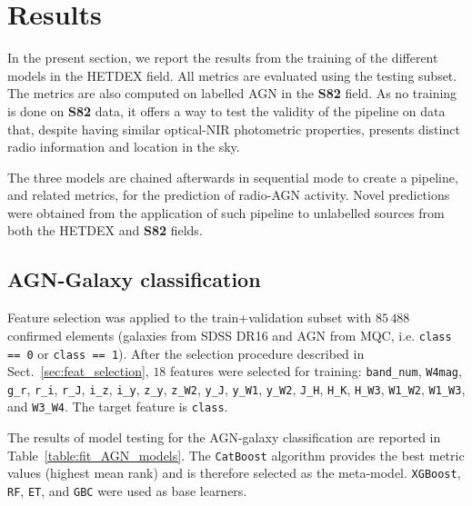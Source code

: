 \documentclass{aa}
\begin{document}

\section{Results}\label{sec:results}
In the present section, we report the results from the training of the different models in the HETDEX field. All metrics are evaluated using the testing subset. The metrics are also computed on labelled AGN in the \textbf{S82} field. As no training is done on \textbf{S82} data, it offers a way to test the validity of the pipeline on data that, despite having similar optical-NIR photometric properties, presents distinct radio information and location in the sky.

The three models are chained afterwards in sequential mode to create a pipeline, and related metrics, for the prediction of radio-AGN activity. Novel predictions were obtained from the application of such pipeline to unlabelled sources from both the HETDEX and \textbf{S82} fields. 

\subsection{AGN-Galaxy classification}\label{sec:results_agn}
Feature selection was applied to the train+validation subset with $85\,488$ confirmed elements (galaxies from SDSS DR16 and AGN from MQC, i.e. \texttt{class == 0} or \texttt{class == 1}). After the selection procedure described in Sect.~\ref{sec:feat_selection}, $18$ features were selected for training: \verb|band_num|, \verb|W4mag|, \verb|g_r|, \verb|r_i|, \verb|r_J|, \verb|i_z|, \verb|i_y|, \verb|z_y|, \verb|z_W2|, \verb|y_J|, \verb|y_W1|, \verb|y_W2|, \verb|J_H|, \verb|H_K|, \verb|H_W3|, \verb|W1_W2|, \verb|W1_W3|, and \verb|W3_W4|. The target feature is \verb|class|.

The results of model testing for the AGN-galaxy classification are reported in Table~\ref{table:fit_AGN_models}. The \verb|CatBoost| algorithm provides the best metric values (highest mean rank) and is therefore selected as the  meta-model. \verb|XGBoost|, \verb|RF|, \verb|ET|, and \verb|GBC| were used as base learners.
\end{document}
